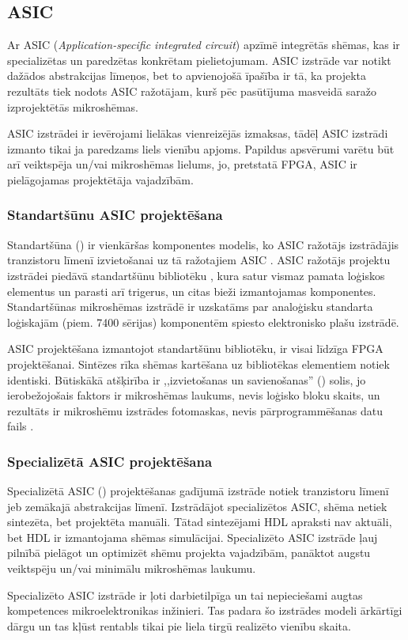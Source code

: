 	
\subsection{ASIC} \label{sec:asic}
	Ar ASIC (\textit{Application-specific integrated circuit}) apzīmē
	integrētās shēmas, kas ir specializētas un paredzētas konkrētam
	pielietojumam. ASIC izstrāde var notikt dažādos abstrakcijas līmeņos,
	bet to apvienojošā īpašība ir tā, ka projekta rezultāts tiek nodots
	ASIC ražotājam, kurš pēc pasūtījuma 
	masveidā saražo izprojektētās mikroshēmas.
	
	ASIC izstrādei ir ievērojami lielākas vienreizējās izmaksas, tādēļ ASIC
	izstrādi izmanto tikai ja paredzams liels vienību apjoms. Papildus
	apsvērumi varētu būt arī veiktspēja un/vai mikroshēmas lielums, jo,
	pretstatā FPGA, ASIC ir pielāgojamas projektētāja vajadzībām.
	
	\subsubsection{Standartšūnu ASIC projektēšana}
		Standartšūna () ir vienkāršas komponentes
		modelis, ko ASIC ražotājs izstrādājis tranzistoru līmenī
		izvietošanai uz tā ražotajiem ASIC \cite{Golshan-ASIC}.
		ASIC ražotājs projektu
		izstrādei piedāvā standartšūnu bibliotēku
		\cite{Golshan-ASIC}\cite{Perry-VHDL},
		kura satur vismaz pamata
		loģiskos elementus un parasti arī trigerus, un citas bieži
		izmantojamas komponentes. Standartšūnas mikroshēmas izstrādē ir
		uzskatāms par analoģisku standarta loģiskajām (piem. 7400 sērijas)
		komponentēm spiesto elektronisko plašu izstrādē.
	
		ASIC projektēšana izmantojot standartšūnu bibliotēku, ir visai
		līdzīga FPGA projektēšanai. Sintēzes rīka shēmas kartēšana uz
		bibliotēkas elementiem notiek identiski. Būtiskākā atšķirība
		ir ,,izvietošanas un savienošanas'' () solis,
		jo ierobežojošais faktors ir mikroshēmas laukums, nevis
		loģisko bloku skaits, un rezultāts ir 
		mikroshēmu izstrādes fotomaskas, nevis
		pārprogrammēšanas datu fails \cite{Golshan-ASIC}.
	
	\subsubsection{Specializētā ASIC projektēšana}
		Specializētā ASIC () projektēšanas gadījumā
		izstrāde notiek tranzistoru līmenī jeb zemākajā abstrakcijas
		līmenī. Izstrādājot specializētos ASIC, shēma netiek sintezēta, bet
		projektēta manuāli. Tātad sintezējami HDL apraksti nav aktuāli, bet
		HDL ir izmantojama shēmas simulācijai. Specializēto ASIC izstrāde 
		ļauj pilnībā
		pielāgot un optimizēt shēmu projekta vajadzībām, panāktot
		augstu veiktspēju un/vai minimālu mikroshēmas laukumu.
		
		Specializēto ASIC izstrāde ir ļoti darbietilpīga un tai nepieciešami
		augtas kompetences mikroelektronikas inžinieri. Tas padara šo
		izstrādes modeli ārkārtīgi dārgu un tas kļūst rentabls tikai pie
		liela tirgū realizēto vienību skaita.
		
		

